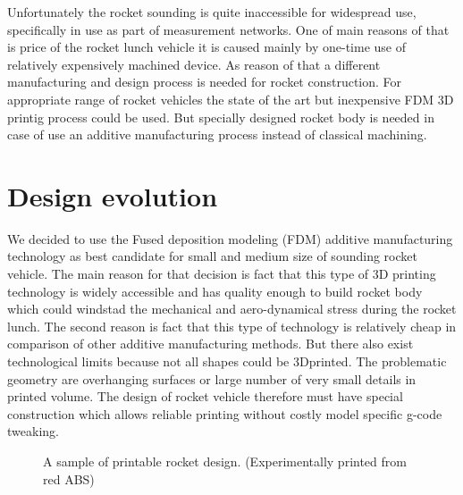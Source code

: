 \documentclass{poster16}
\begin{document}
Unfortunately the rocket sounding is quite inaccessible for widespread use, specifically in use as part of measurement networks. One of main reasons of that is price of the rocket lunch vehicle it is caused mainly by one-time use of relatively expensively machined device. 
As reason of that a different manufacturing and design process is needed for rocket construction. 
For appropriate range of rocket vehicles the state of the art but inexpensive FDM 3D printig process could be used. But specially designed rocket body is needed in case of use an additive manufacturing process instead of classical machining. 

\section{Design evolution}

We decided to use the Fused deposition modeling (FDM) additive manufacturing technology as best candidate for small and medium size of sounding rocket vehicle. The main reason for that decision is fact that this type of 3D printing technology is widely accessible and has quality enough to build rocket body which could windstad the mechanical and aero-dynamical stress during the rocket lunch. The second reason is fact that this type of technology is relatively  cheap in comparison of other additive manufacturing methods. 
But there also exist technological limits because not all shapes could be 3Dprinted. The problematic geometry are overhanging surfaces or large number of very small details in printed volume. 
The design of rocket vehicle therefore must have special construction which allows reliable printing without costly model specific g-code tweaking. 

\begin{figure}[ht]
\begin{center}
\caption{A sample of printable rocket design. (Experimentally printed from red ABS)} 
\label{fig:printed_parts}
\end{center}
\end{figure}
\end{document}
